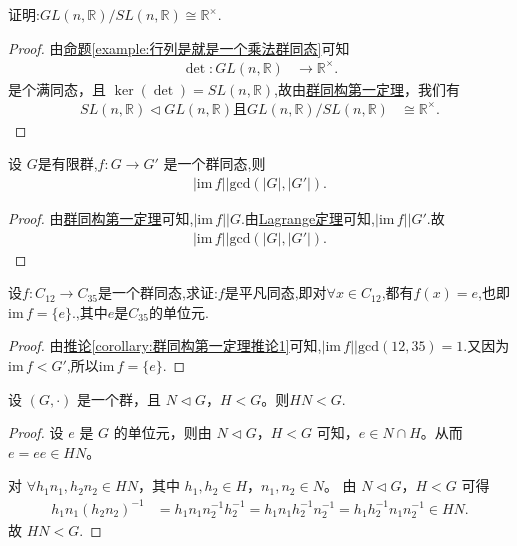 \documentclass[../../main.tex]{subfiles}
\begin{document}
\begin{example}
证明:$GL(n, \mathbb{R})/SL(n, \mathbb{R})\cong \mathbb{R}^{\times}$.
\end{example}
\begin{proof}
由\hyperref[example:行列是就是一个乘法群同态]{命题\ref{example:行列是就是一个乘法群同态}}可知
\begin{align*}
\det: GL(n, \mathbb{R}) &\to \mathbb{R}^{\times}.
\end{align*}
是个满同态，且 \(\ker(\det) = SL(n, \mathbb{R})\),故由\hyperref[theorem:群同构第一定理]{群同构第一定理}，我们有
\begin{align*}
SL(n, \mathbb{R}) \lhd GL(n, \mathbb{R})\text{且}GL(n, \mathbb{R})/SL(n, \mathbb{R}) &\cong \mathbb{R}^{\times}.
\end{align*} 
\end{proof}

\begin{corollary}\label{corollary:群同构第一定理推论1}
设 $G$是有限群,\(f: G \to G'\) 是一个群同态,则
\begin{align*}
\left| \mathrm{im}\,f \right|\Big | \mathrm{gcd}\left( \left| G \right|,\left| G'\right| \right) .
\end{align*}
\end{corollary}
\begin{proof}
由\hyperref[theorem:群同构第一定理]{群同构第一定理}可知,$\left| \mathrm{im}\,f \right|\Big | G$.由\hyperref[theorem:Lagrange定理]{Lagrange定理}可知,$\left| \mathrm{im}\,f \right|\Big | G'$.故
\begin{align*}
\left| \mathrm{im}\,f \right|\Big | \mathrm{gcd}\left( \left| G \right|,\left| G'\right| \right) .
\end{align*}
\end{proof}

\begin{example}
设$f:C_{12}\to C_{35}$是一个群同态,求证:$f$是平凡同态,即对$\forall x\in C_{12}$,都有$f(x)=e$,也即$\mathrm{im}\,f=\{e\}$.,其中$e$是$C_{35}$的单位元.
\end{example}
\begin{proof}
由\hyperref[corollary:群同构第一定理推论1]{推论\ref{corollary:群同构第一定理推论1}}可知,$\left| \mathrm{im}\,f \right|\Big | \mathrm{gcd}\left( 12,35 \right)=1 .$又因为$\mathrm{im}\,f<G'$,所以$\mathrm{im}\,f=\{e\}$.
\end{proof}

\begin{lemma}\label{lemma:HN<G的条件}
设 \((G, \cdot)\) 是一个群，且 \(N \lhd G\)，\(H < G\)。则$HN<G$.
\end{lemma}
\begin{proof}
设 \(e\) 是 \(G\) 的单位元，则由 \(N \lhd G\)，\(H < G\) 可知，\(e \in N \cap H\)。从而 \(e = ee \in HN\)。

对 \(\forall h_1n_1, h_2n_2 \in HN\)，其中 \(h_1, h_2 \in H\)，\(n_1, n_2 \in N\)。
由 \(N \lhd G\)，\(H < G\) 可得
\begin{align*}
h_1n_1\left( h_2n_2 \right) ^{-1} &= h_1n_1n_{2}^{-1}h_{2}^{-1} = h_1n_1h_{2}^{-1}n_{2}^{-1} = h_1h_{2}^{-1}n_1n_{2}^{-1} \in HN.
\end{align*}
故 \(HN < G\).
\end{proof}
\end{document}
